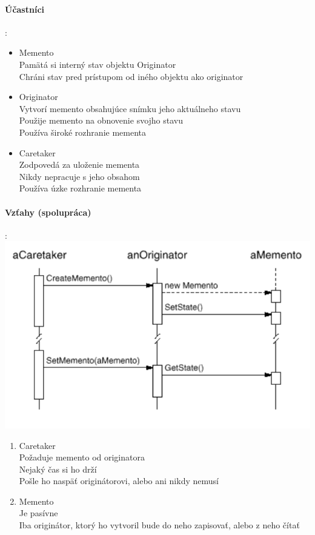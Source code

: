 		\paragraph{Účastníci}:\\
			\begin{itemize}
			\item Memento\\
				Pamätá si interný stav objektu Originator\\
				Chráni stav pred prístupom od iného objektu ako originator
			\item Originator\\
				Vytvorí memento obsahujúce snímku jeho aktuálneho stavu\\
				Použije memento na obnovenie svojho stavu\\
				Používa široké rozhranie mementa
			\item Caretaker\\
				Zodpovedá za uloženie mementa\\
				Nikdy nepracuje s jeho obsahom\\
				Používa úzke rozhranie mementa
			\end{itemize}
		\paragraph{Vzťahy (spolupráca)}:\\

			\includegraphics[width=.7\textwidth]{images/memento2}
				\begin{enumerate}
				\item Caretaker\\
					Požaduje memento od originatora\\
					Nejaký čas si ho drží\\
					Pošle ho naspäť originátorovi, alebo ani nikdy nemusí
				\item Memento\\
					Je pasívne\\
					Iba originátor, ktorý ho vytvoril bude do neho zapisovať, alebo z neho čítať
				\end{enumerate}
